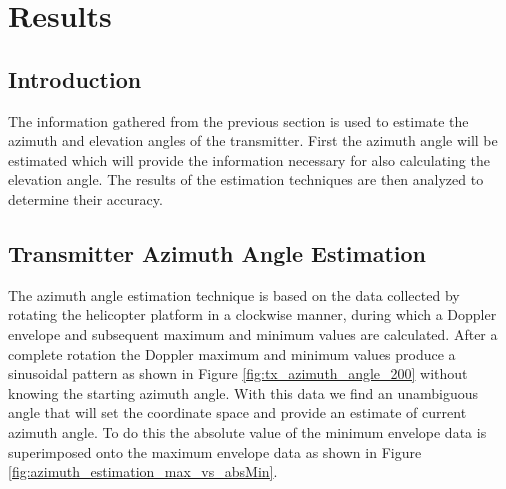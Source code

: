 \chapter{Results} \label{ch:results}

\section{Introduction}
The information gathered from the previous section is used to estimate the azimuth and elevation angles of the transmitter. First the azimuth angle will be estimated which will provide the information necessary for also calculating the elevation angle. The results of the estimation techniques are then analyzed to determine their accuracy.


\section{Transmitter Azimuth Angle Estimation} \label{sec:transmitter_azimuth_angle_estimation}
The azimuth angle estimation technique is based on the data collected by rotating the helicopter platform in a clockwise manner, during which a Doppler envelope and subsequent maximum and minimum values are calculated. After a complete rotation the Doppler maximum and minimum values produce a sinusoidal pattern as shown in Figure \ref{fig:tx_azimuth_angle_200} without knowing the starting azimuth angle. With this data we find an unambiguous angle that will set the coordinate space and provide an estimate of current azimuth angle. To do this the absolute value of the minimum envelope data is superimposed onto the maximum envelope data as shown in Figure \ref{fig:azimuth_estimation_max_vs_absMin}.

